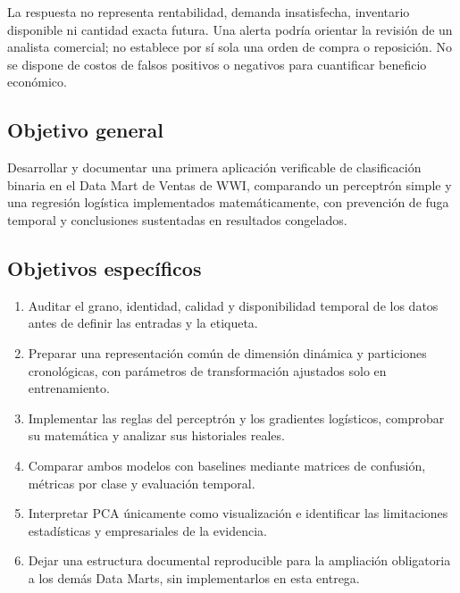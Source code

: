 La respuesta no representa rentabilidad, demanda insatisfecha, inventario disponible ni cantidad exacta futura. Una alerta podría orientar la revisión de un analista comercial; no establece por sí sola una orden de compra o reposición. No se dispone de costos de falsos positivos o negativos para cuantificar beneficio económico.

\subsection{Objetivo general}
Desarrollar y documentar una primera aplicación verificable de clasificación binaria en el Data Mart de Ventas de WWI, comparando un perceptrón simple y una regresión logística implementados matemáticamente, con prevención de fuga temporal y conclusiones sustentadas en resultados congelados.

\subsection{Objetivos específicos}
\begin{enumerate}
\item Auditar el grano, identidad, calidad y disponibilidad temporal de los datos antes de definir las entradas y la etiqueta.
\item Preparar una representación común de dimensión dinámica y particiones cronológicas, con parámetros de transformación ajustados solo en entrenamiento.
\item Implementar las reglas del perceptrón y los gradientes logísticos, comprobar su matemática y analizar sus historiales reales.
\item Comparar ambos modelos con baselines mediante matrices de confusión, métricas por clase y evaluación temporal.
\item Interpretar PCA únicamente como visualización e identificar las limitaciones estadísticas y empresariales de la evidencia.
\item Dejar una estructura documental reproducible para la ampliación obligatoria a los demás Data Marts, sin implementarlos en esta entrega.
\end{enumerate}
